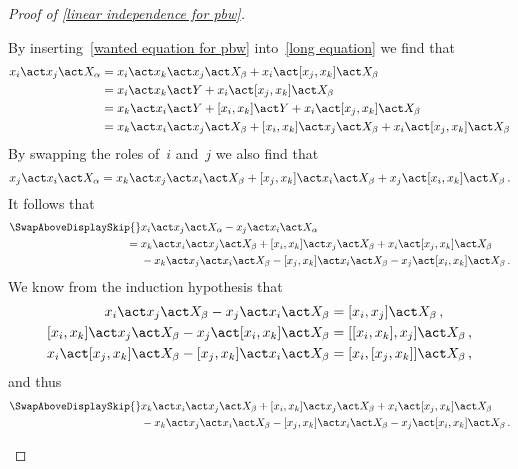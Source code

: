 \begin{proof}[Proof of \cref{linear independence for pbw}]
\begin{description}
			By inserting~\eqref{wanted equation for pbw} into~\eqref{long equation} we find that
			\begin{align*}
				x_i \act x_j \act X_\alpha
				&=
				x_i \act x_k \act x_j \act X_\beta
				+ x_i \act [x_j, x_k] \act X_\beta
				\\
				&=
				x_i \act x_k \act Y
				+ x_i \act [x_j, x_k] \act X_\beta
				\\
				&=
				x_k \act x_i \act Y
				+ [x_i, x_k] \act Y
				+ x_i \act [x_j, x_k] \act X_\beta
				\\
				&=
				x_k \act x_i \act x_j \act X_\beta
				+ [x_i, x_k] \act x_j \act X_\beta
				+ x_i \act [x_j, x_k] \act X_\beta
			\end{align*}
			By swapping the roles of~$i$ and~$j$ we also find that
			\[
				x_j \act x_i \act X_\alpha
				=
				x_k \act x_j \act x_i \act X_\beta
				+ [x_j, x_k] \act x_i \act X_\beta
				+ x_j \act [x_i, x_k] \act X_\beta \,.
			\]
			It follows that
			\begin{align*}
				\SwapAboveDisplaySkip
				{}&
				x_i \act x_j \act X_\alpha
				- x_j \act x_i \act X_\alpha
				\\
				={}&
				x_k \act x_i \act x_j \act X_\beta
				+ [x_i, x_k] \act x_j \act X_\beta
				+ x_i \act [x_j, x_k] \act X_\beta
				\\
				{}&
				- x_k \act x_j \act x_i \act X_\beta
				- [x_j, x_k] \act x_i \act X_\beta
				- x_j \act [x_i, x_k] \act X_\beta \,.
			\end{align*}
			We know from the induction hypothesis that
			\begin{align*}
				x_i \act x_j \act X_\beta
				- x_j \act x_i \act X_\beta
				&=
				[x_i, x_j] \act X_\beta \,,
				\\
				[x_i, x_k] \act x_j \act X_\beta
				- x_j \act [x_i, x_k] \act X_\beta
				&=
				[ [x_i, x_k], x_j ] \act X_\beta \,,
				\\
				x_i \act [x_j, x_k] \act X_\beta
				- [x_j, x_k] \act x_i \act X_\beta
				&=
				[ x_i, [x_j, x_k] ] \act X_\beta \,,
			\end{align*}
			and thus
			\begin{align*}
				\SwapAboveDisplaySkip
				{}&
				x_k \act x_i \act x_j \act X_\beta
				+ [x_i, x_k] \act x_j \act X_\beta
				+ x_i \act [x_j, x_k] \act X_\beta
				\\
				{}&
				- x_k \act x_j \act x_i \act X_\beta
				- [x_j, x_k] \act x_i \act X_\beta
				- x_j \act [x_i, x_k] \act X_\beta \,.
				\\

\end{align*}
\end{description}
\end{proof}
